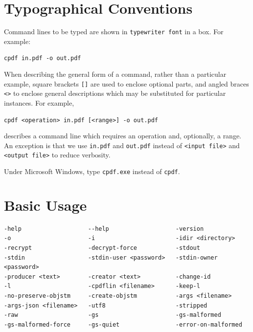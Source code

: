 \documentclass{book}
\begin{document}
\pagestyle{plain}
\tableofcontents\clearpage\pagestyle{empty}

\cleardoublepage
\pagestyle{plain}
\chapter*{Typographical Conventions}
Command lines to be typed are shown in \texttt{typewriter\hspace{-1mm} font} in a box.
For example:
\begin{framed}
\noindent\small\verb!cpdf in.pdf -o out.pdf!
\end{framed}
\noindent When describing the general form of a command, rather than a particular
example, square brackets \verb|[]| are used to enclose optional parts, and
angled braces \verb!<>! to enclose general descriptions which may be
substituted for particular instances. For example,
\begin{framed}
\noindent\small\verb!cpdf <operation> in.pdf [<range>] -o out.pdf!
\end{framed}
\noindent describes a command line which requires an operation and, optionally,
a range. An exception is that we use \texttt{in.pdf} and \texttt{out.pdf}
instead of \texttt{<input file>} and \texttt{<output file>} to reduce
verbosity.

Under Microsoft Windows, type \texttt{cpdf.exe} instead of \texttt{cpdf}.
\clearpage\pagestyle{empty}\cleardoublepage
\mainmatter
\pagestyle{fancy}



\chapter{Basic Usage}\label{chap:1}


\label{basicusage}
  \begin{framed}
  \small
\noindent\begin{verbatim}
-help                   --help                   -version 
-o                      -i                       -idir <directory>
-recrypt                -decrypt-force           -stdout
-stdin                  -stdin-user <password>   -stdin-owner <password>  
-producer <text>        -creator <text>          -change-id
-l                      -cpdflin <filename>      -keep-l
-no-preserve-objstm     -create-objstm           -args <filename>
-args-json <filename>   -utf8                    -stripped
-raw                    -gs                      -gs-malformed
-gs-malformed-force     -gs-quiet                -error-on-malformed\end{verbatim}\end{framed}
\end{document}
